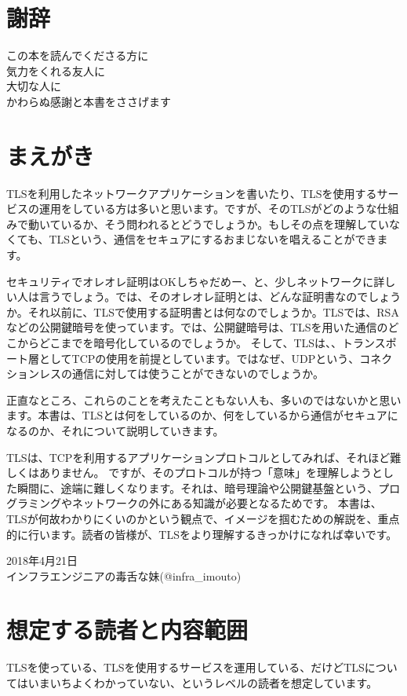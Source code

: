 \section*{謝辞}
\begin{center}
この本を読んでくださる方に \\
気力をくれる友人に \\
大切な人に \\
かわらぬ感謝と本書をささげます
\end{center}

\section*{まえがき}
TLSを利用したネットワークアプリケーションを書いたり、TLSを使用するサービスの運用をしている方は多いと思います。ですが、そのTLSがどのような仕組みで動いているか、そう問われるとどうでしょうか。もしその点を理解していなくても、TLSという、通信をセキュアにするおまじないを唱えることができます。

セキュリティでオレオレ証明はOKしちゃだめー、と、少しネットワークに詳しい人は言うでしょう。では、そのオレオレ証明とは、どんな証明書なのでしょうか。それ以前に、TLSで使用する証明書とは何なのでしょうか。TLSでは、RSAなどの公開鍵暗号を使っています。では、公開鍵暗号は、TLSを用いた通信のどこからどこまでを暗号化しているのでしょうか。
そして、TLSは、、トランスポート層としてTCPの使用を前提としています。ではなぜ、UDPという、コネクションレスの通信に対しては使うことができないのでしょうか。

正直なところ、これらのことを考えたこともない人も、多いのではないかと思います。本書は、TLSとは何をしているのか、何をしているから通信がセキュアになるのか、それについて説明していきます。

TLSは、TCPを利用するアプリケーションプロトコルとしてみれば、それほど難しくはありません。
ですが、そのプロトコルが持つ「意味」を理解しようとした瞬間に、途端に難しくなります。それは、暗号理論や公開鍵基盤という、プログラミングやネットワークの外にある知識が必要となるためです。
本書は、TLSが何故わかりにくいのかという観点で、イメージを掴むための解説を、重点的に行います。読者の皆様が、TLSをより理解するきっかけになれば幸いです。

\begin{flushright}
2018年4月21日 \\
インフラエンジニアの毒舌な妹(@infra\_imouto)
\end{flushright}

\section*{想定する読者と内容範囲}
TLSを使っている、TLSを使用するサービスを運用している、だけどTLSについてはいまいちよくわかっていない、というレベルの読者を想定しています。


